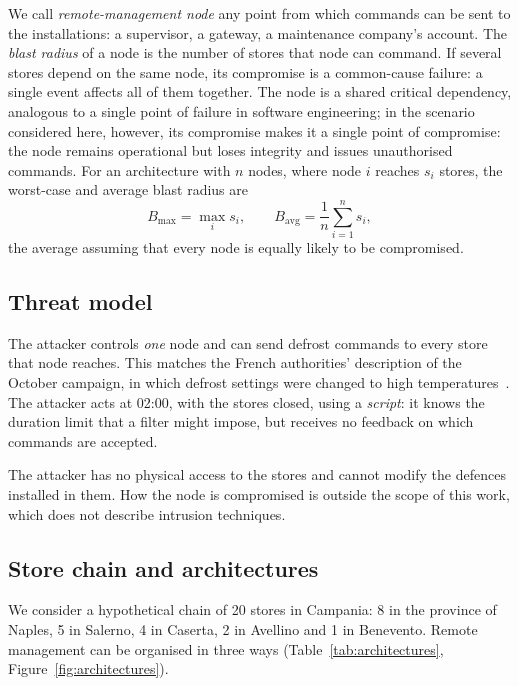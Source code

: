 \documentclass{ceurart}
\begin{document}
We call \emph{remote-management node} any point from which commands can be sent to the installations: a supervisor, a gateway, a maintenance company's account.
The \emph{blast radius} of a node is the number of stores that node can command.
If several stores depend on the same node, its compromise is a common-cause failure: a single event affects all of them together.
The node is a shared critical dependency, analogous to a single point of failure in software engineering; in the scenario considered here, however, its compromise makes it a single point of compromise: the node remains operational but loses integrity and issues unauthorised commands.
For an architecture with $n$ nodes, where node $i$ reaches $s_i$ stores, the worst-case and average blast radius are
\begin{equation}
  B_{\max} = \max_{i} s_i, \qquad B_{\mathrm{avg}} = \frac{1}{n}\sum_{i=1}^{n} s_i,
\end{equation}
the average assuming that every node is equally likely to be compromised.

\subsection{Threat model}

The attacker controls \emph{one} node and can send defrost commands to every store that node reaches.
This matches the French authorities' description of the October campaign, in which defrost settings were changed to high temperatures~\cite{anssi2026attribution}.
The attacker acts at 02:00, with the stores closed, using a \emph{script}: it knows the duration limit that a filter might impose, but receives no feedback on which commands are accepted.

The attacker has no physical access to the stores and cannot modify the defences installed in them.
How the node is compromised is outside the scope of this work, which does not describe intrusion techniques.

\subsection{Store chain and architectures}

We consider a hypothetical chain of 20 stores in Campania: 8 in the province of Naples, 5 in Salerno, 4 in Caserta, 2 in Avellino and 1 in Benevento.
Remote management can be organised in three ways (Table~\ref{tab:architectures}, Figure~\ref{fig:architectures}).
\end{document}
